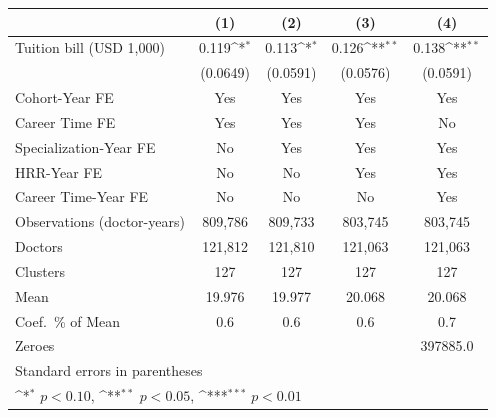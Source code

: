 {
\def\sym#1{\ifmmode^{#1}\else\(^{#1}\)\fi}
\begin{tabular}{l*{4}{c}}
\hline\hline
                    &\multicolumn{1}{c}{(1)}         &\multicolumn{1}{c}{(2)}         &\multicolumn{1}{c}{(3)}         &\multicolumn{1}{c}{(4)}         \\
\hline
Tuition bill (USD 1,000)&       0.119\sym{*}  &       0.113\sym{*}  &       0.126\sym{**} &       0.138\sym{**} \\
                    &    (0.0649)         &    (0.0591)         &    (0.0576)         &    (0.0591)         \\
[1em]
Cohort-Year FE      &         Yes         &         Yes         &         Yes         &         Yes         \\
[1em]
Career Time FE      &         Yes         &         Yes         &         Yes         &          No         \\
[1em]
Specialization-Year FE&          No         &         Yes         &         Yes         &         Yes         \\
[1em]
HRR-Year FE         &          No         &          No         &         Yes         &         Yes         \\
[1em]
Career Time-Year FE &          No         &          No         &          No         &         Yes         \\
\hline
Observations (doctor-years)&     809,786         &     809,733         &     803,745         &     803,745         \\
Doctors             &     121,812         &     121,810         &     121,063         &     121,063         \\
Clusters            &         127         &         127         &         127         &         127         \\
Mean                &      19.976         &      19.977         &      20.068         &      20.068         \\
Coef.\ \% of Mean   &         0.6         &         0.6         &         0.6         &         0.7         \\
Zeroes              &                     &                     &                     &    397885.0         \\
\hline\hline
\multicolumn{5}{l}{\footnotesize Standard errors in parentheses}\\
\multicolumn{5}{l}{\footnotesize \sym{*} \(p<0.10\), \sym{**} \(p<0.05\), \sym{***} \(p<0.01\)}\\
\end{tabular}
}
